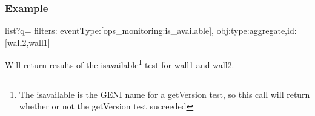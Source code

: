 \begin{otherlanguage}{english}
\subsubsection{Example}
\begin{lt}
list?q={
  filters:{
    eventType:[ops_monitoring:is_available],
    obj:{type:aggregate,id:[wall2,wall1]}
  }
}
\end{lt}
Will return results of the is\textunderscore available\footnote{The is\textunderscore available is the GENI name for a getVersion test, so this call will return whether or not the getVersion test succeeded} test for wall1 and wall2.
\clearpage
\end{otherlanguage}
